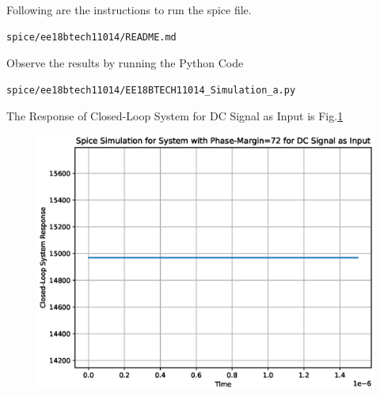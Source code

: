 \begin{enumerate}[label=\thesection.\arabic*.,ref=\thesection.\theenumi]
Following are the instructions to run the spice file.
\begin{lstlisting}
spice/ee18btech11014/README.md
\end{lstlisting}

Observe the results by running the Python Code
\begin{lstlisting}
spice/ee18btech11014/EE18BTECH11014_Simulation_a.py
\end{lstlisting}

The Response of Closed-Loop System for DC Signal as Input is Fig.\ref{fig:DC}
\begin{figure}[ht!]
	\begin{center}
		\includegraphics[width=\columnwidth]{./figs/ee18btech11014/ee18btech11014_Spice_Result_PM=72.eps}
	\end{center}
	\caption{}
	\label{fig:DC}
\end{figure}

\end{enumerate}
